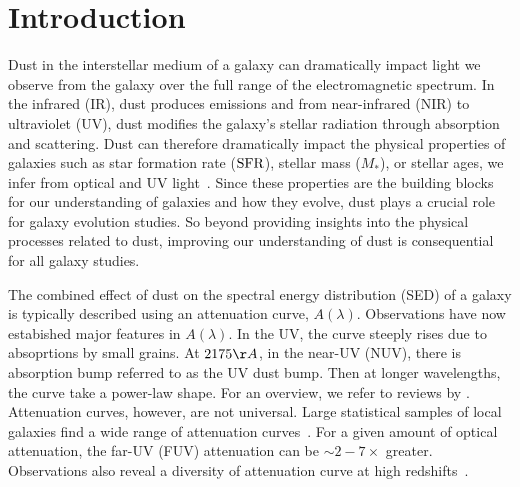 \section{Introduction} \label{sec:intro} 
Dust in the interstellar medium of a galaxy can dramatically impact light we
observe from the galaxy over the full range of the electromagnetic spectrum. 
In the infrared (IR), dust produces emissions and from near-infrared (NIR) to
ultraviolet (UV), dust modifies the galaxy's stellar radiation through
absorption and scattering. Dust can therefore dramatically impact the physical
properties of galaxies such as star formation rate (${\rm SFR}$), stellar mass
($M_*$), or stellar ages, we infer from optical and UV light~\citep[see
reviews by][]{walcher2011, conroy2013}. Since these properties are the building
blocks for our understanding of galaxies and how they evolve, dust plays a crucial
role for galaxy evolution studies. So beyond providing insights into the
physical processes related to dust, improving our understanding of dust is
consequential for all galaxy studies.

The combined effect of dust on the spectral energy distribution (SED) of a
galaxy is typically described using an attenuation curve, $A(\lambda)$.
Observations have now estabished major features in $A(\lambda)$. In the UV, the 
curve steeply rises due to absoprtions by small grains. At $2175\AA$, in the 
near-UV (NUV), there is absorption bump referred to as the UV dust bump. Then 
at longer wavelengths, the curve take a power-law shape. For an overview, we 
refer to reviews by \cite{calzetti2001, draine2003, galliano2018}. Attenuation
curves, however, are not universal. Large statistical samples of local galaxies
find a wide range of attenuation curves~\citep{wild2011, battisti2017,
salim2018, salim2020}. For a given amount of optical attenuation, the far-UV
(FUV) attenuation can be $\sim 2-7\times$ greater. Observations also reveal a
diversity of attenuation curve at high redshifts~\citep[\eg][]{reddy2015, salmon2016}.

